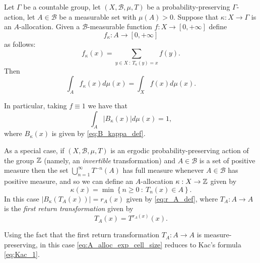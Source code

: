 \documentclass[12pt,reqno]{amsart}
\begin{document}
\begin{prop}\label{thm:Kacs_lemma_A_allocation}
Let $\Gamma$ be a countable group, let  $(X,\mathcal{B},\mu,T)$ be a probability-preserving $\Gamma$-action, let $A \in \mathcal{B}$ be a measurable set with $\mu(A)>0$.
Suppose that $\kappa:X \to \Gamma$ is an $A$-allocation.
Given a $\mathcal{B}$-measurable function  $f:X\to  [0,+\infty]$ define
\[
f_\kappa:A \to [0,+\infty]
\]
as follows:
\begin{equation}\label{eq:f_kappa_def}
    f_\kappa(x)= \sum_{y \in X ~:~ T_\kappa (y) = x} f(y).
\end{equation}
Then
\begin{equation}
    \int_A f_\kappa(x) d\mu(x) = \int_X f(x) d\mu(x).
\end{equation}

In particular, taking $f \equiv 1$ we have that
\begin{equation}\label{eq:A_alloc_exp_cell_size}
    \int_A | B_\kappa(x)| d\mu(x) = 1,
\end{equation}
where $B_\kappa(x)$ is given by \eqref{eq:B_kappa_def}.
\end{prop}

As a special case,  if $(X,\mathcal{B},\mu,T)$ is an ergodic probability-preserving action of the group $\mathbb{Z}$ (namely, an \emph{ invertible} transformation) and $A \in \mathcal{B}$ is a set of positive measure then  
 the set $\bigcup_{n=1}^\infty T^{-n}(A)$ has  full measure whenever $A \in \mathcal{B}$ has positive measure, and so we can define an $A$-allocation 
$\kappa:X \to \mathbb{Z}$ given by
\[\kappa(x) = \min \left\{ n \ge 0~:~ T_n(x) \in A\right\}.\]
In this case $|B_\kappa(T_A(x))| =r_A(x)$ given by \eqref{eq:r_A_def}, 
where $T_A:A \to A$ is the \emph{first return transformation} given by
\[
T_A(x)= T^{r_A(x)}(x).
\]

Using the fact that the first return transformation $T_A:A \to A$ is measure-preserving, in this case \eqref{eq:A_alloc_exp_cell_size} reduces to Kac's formula \eqref{eq:Kac_1}.
\end{document}
